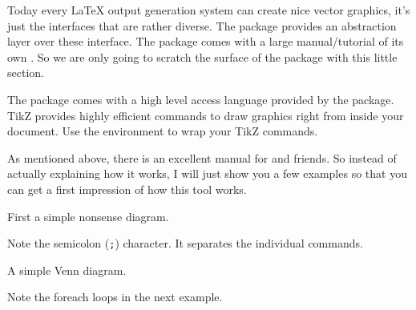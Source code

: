 Today every \LaTeX{} output generation system can create nice vector graphics,
it's just the interfaces that are rather diverse. The  package provides an
abstraction layer over these interface. The
 package comes with a large manual/tutorial of its own
\cite{pgfplot}. So we are only going to scratch the surface of the package with this little
section.

The  package comes with a high level access language provided by the   package.
TikZ provides highly efficient commands to
draw graphics right from inside your document. Use the 
environment to wrap your TikZ commands.

As mentioned above, there is an excellent manual for  and friends. So
instead of actually explaining how it works, I will just show you a few examples
so that you can get a first impression of how this tool works.

First a simple nonsense diagram.
\begin{example}
\end{example}
Note the semicolon (\texttt{;}) character. It separates the individual commands.

A simple Venn diagram.
\begin{example}
\end{example}

Note the foreach loops in the next example.
\begin{example}
\end{example}

